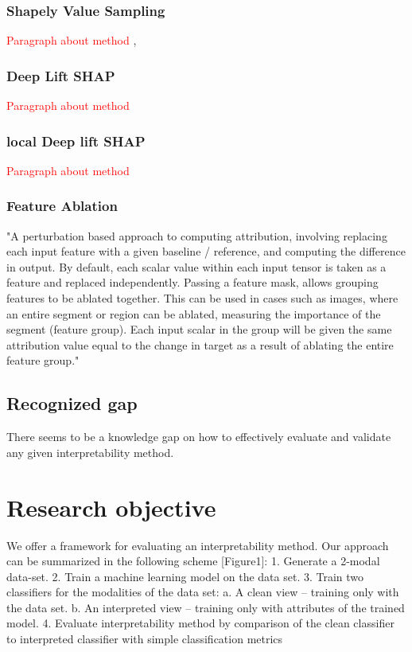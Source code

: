 \documentclass[12pt]{report}
\begin{document}
\subsection{Shapely Value Sampling}
		\textcolor{red}{Paragraph about method} \cite{CASTRO20091726}, \cite{trumbelj2010AnEE}

\subsection{Deep Lift SHAP}
		\textcolor{red}{Paragraph about method} \cite{DBLP:journals/corr/LundbergL17}


\subsection{local Deep lift SHAP}

		\textcolor{red}{Paragraph about method} \cite{https://doi.org/10.48550/arxiv.1711.06104}

\subsection{Feature Ablation}
"A perturbation based approach to computing attribution, involving replacing each input feature with a given baseline / reference, and computing the difference in output. By default, each scalar value within each input tensor is taken as a feature and replaced independently. Passing a feature mask, allows grouping features to be ablated together. This can be used in cases such as images, where an entire segment or region can be ablated, measuring the importance of the segment (feature group). Each input scalar in the group will be given the same attribution value equal to the change in target as a result of ablating the entire feature group."

\newpage
\section{Recognized gap}

There seems to be a knowledge gap on how to
effectively evaluate and validate any given interpretability method.



\chapter{Research objective } 

We offer a framework for evaluating an interpretability method. Our approach can be summarized in
the following scheme [Figure1]:
1. Generate a 2-modal data-set.
2. Train a machine learning model on the data set.
3. Train two classifiers for the modalities of the data set:
a. A clean view – training only with the data set.
b. An interpreted view – training only with attributes of the trained model.
4. Evaluate interpretability method by comparison of the clean classifier to interpreted classifier
with simple classification metrics
\end{document}
